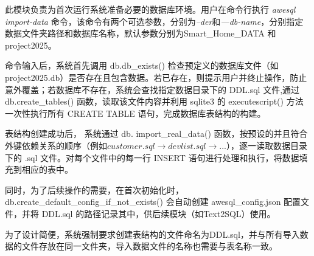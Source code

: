 \begin{CJK*}{UTF8}{song}

此模块负责为首次运行系统准备必要的数据库环境。用户在命令行执行 \textit{awesql import-data} 命令，该命令有两个可选参数，分别为\textit{--der}和\textit{—db-name}，分别指定数据文件夹路径和数据库名称，默认参数分别为Smart\_Home\_DATA 和project2025。

命令输入后，系统首先调用 db.db\_exists() 检查预定义的数据库文件（如 project2025.db）是否存在且包含数据。若已存在，则提示用户并终止操作，防止意外覆盖；若数据库不存在，系统会查找指定数据目录下的 DDL.sql 文件,通过 db.create\_tables() 函数，读取该文件内容并利用 sqlite3 的 executescript() 方法一次性执行所有 CREATE TABLE 语句，完成数据库表结构的构建。

表结构创建成功后， 系统通过 db. import\_real\_data() 函数，按预设的并且符合外键依赖关系的顺序（例如$ customer.sql \rightarrow devlist.sql \rightarrow ...$），逐一读取数据目录下的 .sql 文件。对每个文件中的每一行 INSERT 语句进行处理和执行，将数据填充到相应的表中。

同时，为了后续操作的需要，在首次初始化时，db.create\_default\_config\_if\_not\_exists() 会自动创建 awesql\_config.json 配置文件，并将 DDL.sql 的路径记录其中，供后续模块（如Text2SQL）使用。

为了设计简便，系统强制要求创建表结构的文件命名为DDL.sql，并与所有导入数据的文件存放在同一文件夹，导入数据文件的名称也需要与表名称一致。


\end{CJK*}